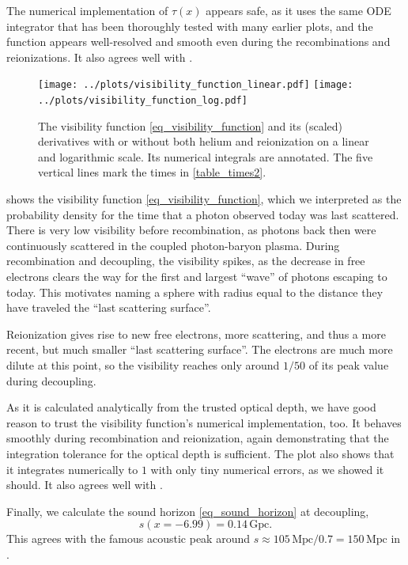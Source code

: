 \documentclass[10pt,a4paper]{article}
\begin{document}
The numerical implementation of $\tau(x)$ appears safe, as it uses the same ODE integrator that has been thoroughly tested with many earlier plots,
and the function appears well-resolved and smooth even during the recombinations and reionizations.
It also agrees well with \cite[\textsc{fig. 2}]{callinHowCalculateCMB2006}.

\begin{figure}[t]
	\centering
	\texttt{[image: ../plots/visibility\_function\_linear.pdf]}
	\texttt{[image: ../plots/visibility\_function\_log.pdf]}
	\caption{
		The visibility function \eqref{eq_visibility_function} and its (scaled) derivatives with or without both helium and reionization on a linear and logarithmic scale.
		Its numerical integrals are annotated.
		The five vertical lines mark the times in \cref{table_times2}.
	}
	\label{fig_visibility_function}
\end{figure}

 shows the visibility function \eqref{eq_visibility_function},
which we interpreted as the probability density for the time that a photon observed today was last scattered.
There is very low visibility before recombination, as photons back then were continuously scattered in the coupled photon-baryon plasma.
During recombination and decoupling, the visibility spikes, as the decrease in free electrons clears the way for the first and largest ``wave'' of photons escaping to today.
This motivates naming a sphere with radius equal to the distance they have traveled the ``last scattering surface''.

Reionization gives rise to new free electrons, more scattering, and thus a more recent, but much smaller ``last scattering surface''.
The electrons are much more dilute at this point, so the visibility reaches only around $1/50$ of its peak value during decoupling.

As it is calculated analytically from the trusted optical depth, we have good reason to trust the visibility function's numerical implementation, too.
It behaves smoothly during recombination and reionization, again demonstrating that the integration tolerance for the optical depth is sufficient.
The plot also shows that it integrates numerically to $1$ with only tiny numerical errors, as we showed it should.
It also agrees well with \cite[\textsc{fig. 3}]{callinHowCalculateCMB2006}.

Finally, we calculate the sound horizon \eqref{eq_sound_horizon} at decoupling,
\begin{equation}
	s(x=-6.99) = 0.14\,\mathrm{Gpc}.
\end{equation}
This agrees with the famous acoustic peak around $s \approx 105\,\mathrm{Mpc}/0.7 = 150\,\mathrm{Mpc}$ in \cite[\textsc{Fig. 2}]{eisensteinDetectionBaryonAcoustic2005}.
\end{document}
